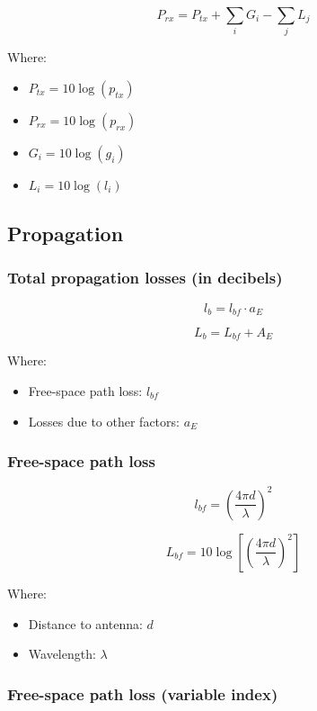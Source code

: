 \documentclass[../main.tex]{subfiles}
\begin{document}
$$
	P_{rx} = P_{tx} + \sum_i G_i - \sum_j L_j
$$

Where:

\begin{itemize}
	\item $P_{tx} = 10 \log (p_{tx})$
	\item $P_{rx} = 10 \log (p_{rx})$
	\item $G_i = 10 \log (g_i)$
	\item $L_i = 10 \log (l_i)$
\end{itemize}

\subsection{Propagation}

\subsubsection{Total propagation losses (in decibels)}

$$
	l_b = l_{bf} \cdot a_E
$$

$$
	L_b = L_{bf} + A_E
$$

Where:

\begin{itemize}
	\item Free-space path loss: $l_{bf}$
	\item Losses due to other factors: $a_E$
\end{itemize}

\subsubsection{Free-space path loss}

$$
	l_{bf} = \left( \frac {4 \pi d} {\lambda} \right)^2
$$

$$
	L_{bf} = 10 \log \left[ \left( \frac {4 \pi d} {\lambda} \right)^2 \right]
$$

Where:

\begin{itemize}
	\item Distance to antenna: $d$
	\item Wavelength: $\lambda$
\end{itemize}

\subsubsection{Free-space path loss (variable index)}
\end{document}
